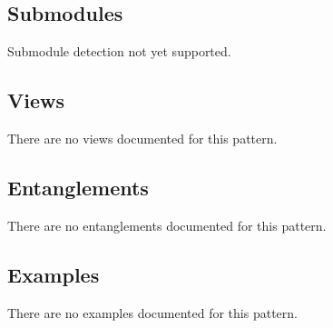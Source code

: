 \subsection{Submodules}
\label{ssec:submodules}
Submodule detection not yet supported.

\subsection{Views}
\label{ssec:views}
There are no views documented for this pattern.


\subsection{Entanglements}
\label{ssec:entanglements}
There are no entanglements documented for this pattern.

\subsection{Examples}
\label{ssec:examples}
There are no examples documented for this pattern.


